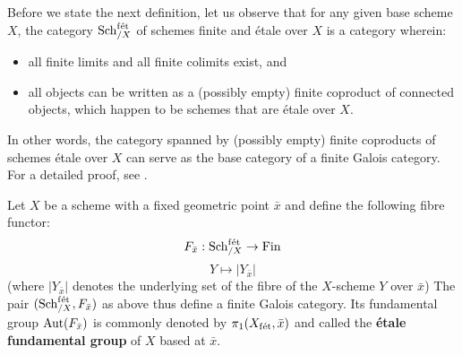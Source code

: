         Before we state the next definition, let us observe that for any given base scheme $X$, the category $\mathrm{Sch}_{/X}^{\mathrm{f\acute{e}t}}$ of schemes finite and \'etale over $X$ is a category wherein:
            \begin{itemize}
                \item all finite limits and all finite colimits exist, and
                \item all objects can be written as a (possibly empty) finite coproduct of connected objects, which happen to be schemes that are \'etale over $X$.  
            \end{itemize}
        In other words, the category spanned by (possibly empty) finite coproducts of schemes \'etale over $X$ can serve as the base category of a finite Galois category. For a detailed proof, see \cite[\href{https://stacks.math.columbia.edu/tag/0BN9}{Tag 0BN9}]{stacks}. 
        \begin{definition} \label{def: etale_fundamental_groups}
            Let $X$ be a scheme with a fixed geometric point $\bar{x}$ and define the following fibre functor:
                $$F_{\bar{x}}: \mathrm{Sch}_{/X}^{\mathrm{f\acute{e}t}} \to \mathrm{Fin}$$
                $$Y \mapsto |Y_{\bar{x}}|$$
            (where $|Y_{\bar{x}}|$ denotes the underlying set of the fibre of the $X$-scheme $Y$ over $\bar{x}$) The pair $(\mathrm{Sch}_{/X}^{\mathrm{f\acute{e}t}}, F_{\bar{x}})$ as above thus define a finite Galois category. Its fundamental group $\mathrm{Aut}(F_{\bar{x}})$ is commonly denoted by $\pi_1(X_{\mathrm{f\acute{e}t}}, \bar{x})$ and called the \textbf{\'etale fundamental group} of $X$ based at $\bar{x}$.
        \end{definition}
